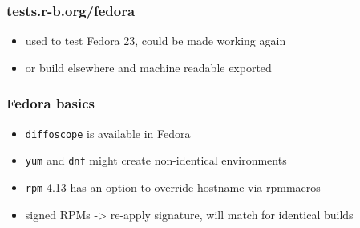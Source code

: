 \documentclass[14pt,aspectratio=169]{beamer}
\begin{document}
\begin{frame}
 \frametitle{tests.r-b.org/fedora}
 \begin{itemize}
  \item used to test Fedora 23, could be made working again
  \item or build elsewhere and machine readable exported
  \end{itemize}
\end{frame}

\begin{frame}
 \frametitle{Fedora basics}
 \begin{itemize}
  \item \texttt{diffoscope} is available in Fedora
  \item \texttt{yum} and \texttt{dnf} might create non-identical environments
  \item \texttt{rpm}-4.13 has an option to override hostname via rpmmacros
  \item signed RPMs -> re-apply signature, will match for identical builds
  \end{itemize}
\end{frame}
\end{document}
